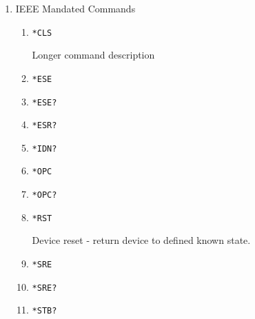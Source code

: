 \documentclass[a4paper,10pt]{article}
\begin{document}
\begin{enumerate}
\item IEEE Mandated Commands
    \begin{enumerate}
        \item \hypertarget{cls}{} 
            \begin{verbatim}*CLS\end{verbatim}
            \begin{description}
                Longer command description
            \end{description}
        \item \begin{verbatim}*ESE\end{verbatim}
		\item \begin{verbatim}*ESE?\end{verbatim}
		\item \begin{verbatim}*ESR?\end{verbatim}
		\item \begin{verbatim}*IDN?\end{verbatim}
		\item \begin{verbatim}*OPC\end{verbatim}
		\item \begin{verbatim}*OPC?\end{verbatim}
        \item \begin{verbatim}*RST\end{verbatim}
            \begin{description}
                Device reset - return device to defined known state.
            \end{description}
        \item \begin{verbatim}*SRE\end{verbatim}
        \item \begin{verbatim}*SRE?\end{verbatim}
        \item \begin{verbatim}*STB?\end{verbatim}

\end{enumerate}
\end{enumerate}
\end{document}
